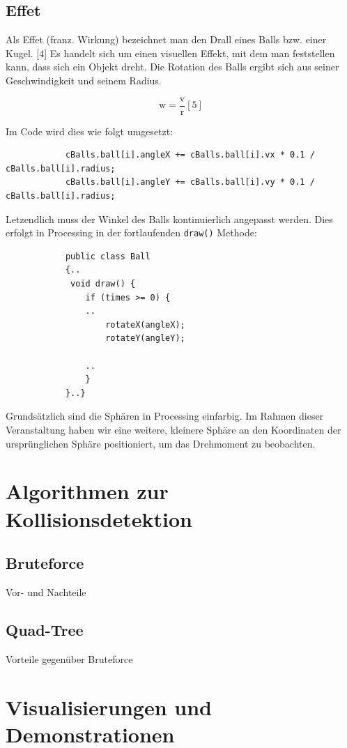\documentclass[12pt,a4paper]{article}
\begin{document}
		
		\subsection{Effet}
		
		Als Effet (franz. Wirkung) bezeichnet man den Drall eines Balls bzw. einer Kugel. [4] Es handelt sich um einen visuellen Effekt, mit dem man feststellen kann, dass sich ein Objekt dreht. Die Rotation des Balls ergibt sich aus seiner Geschwindigkeit und seinem Radius.
		
\[
\text{w} = \frac{\text{v}}{\text{r}} [5]
\]

		
		Im Code wird dies wie folgt umgesetzt:
		
		\begin{verbatim}
			cBalls.ball[i].angleX += cBalls.ball[i].vx * 0.1 / cBalls.ball[i].radius;
			cBalls.ball[i].angleY += cBalls.ball[i].vy * 0.1 / cBalls.ball[i].radius;
		\end{verbatim}
		
		
		Letzendlich muss der Winkel des Balls kontinuierlich angepasst werden. Dies erfolgt in Processing in der fortlaufenden \texttt{draw()} Methode:
		
		\begin{verbatim}
			public class Ball
			{..
			 void draw() {
				if (times >= 0) {
				..
					rotateX(angleX);     
					rotateY(angleY);      
					
				..
				}
			}..}
		\end{verbatim}
		
		Grundsätzlich sind die Sphären in Processing einfarbig. Im Rahmen dieser Veranstaltung haben wir eine weitere, kleinere Sphäre an den Koordinaten der ursprünglichen Sphäre positioniert, um das Drehmoment zu beobachten.		
		
		
	
	\section{Algorithmen zur Kollisionsdetektion}
	
	\subsection{Bruteforce}
	Vor- und Nachteile
	\subsection{Quad-Tree}
	Vorteile gegenüber Bruteforce
	
	\section{Visualisierungen und Demonstrationen}
	
\end{document}
